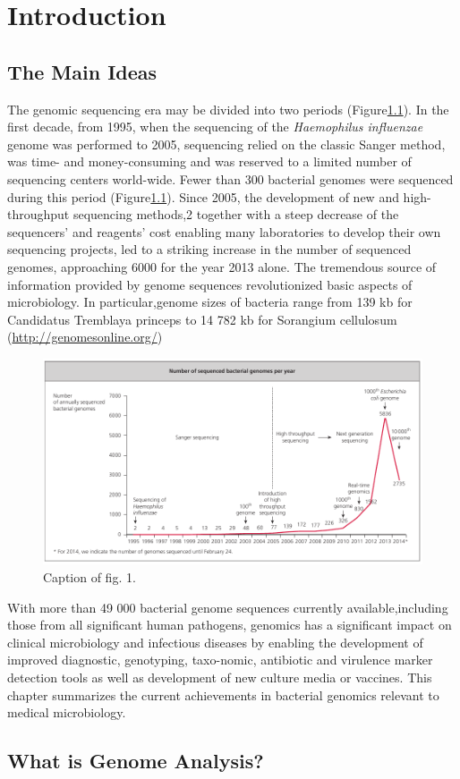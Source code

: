 \chapter{Introduction}\label{ch:ch1}
\section{The Main Ideas}
The genomic sequencing era may be divided into two periods (Figure\ref{fig:sequencing_stats}). In the first decade, from 1995, when the sequencing of the \textit{Haemophilus influenzae} genome was performed \cite{ray2003} to 2005, sequencing relied on the classic Sanger method, was time- and money-consuming and was reserved to a limited number of sequencing centers world-wide. Fewer than 300 bacterial genomes were sequenced during this period (Figure\ref{fig:sequencing_stats}). Since 2005, the development of new and high-throughput sequencing methods,2 together with a steep decrease of the sequencers’ and reagents’ cost enabling many laboratories to develop their own sequencing projects, led to a striking increase in the number of sequenced genomes, approaching 6000 for the year 2013 alone. The tremendous source of information provided by genome sequences revolutionized basic aspects of microbiology. In particular,genome sizes of bacteria range from 139 kb for Candidatus Tremblaya princeps to 14 782 kb for Sorangium cellulosum (\url{http://genomesonline.org/})  \cite{ray2003}

\begin{figure}
	\centering
	\includegraphics[width=0.9\linewidth]{images/sequencing_stats.png}
	\caption{Caption of fig. 1.}
	\label{fig:sequencing_stats}
\end{figure} 

With more than 49 000 bacterial genome sequences currently available,including those from all significant human pathogens, genomics has a significant impact on clinical microbiology and infectious diseases by enabling the development of improved diagnostic, genotyping, taxo-nomic, antibiotic and virulence marker detection tools as well as development of new culture media or vaccines. This chapter summarizes the current achievements in bacterial genomics relevant to medical microbiology.


\section{What is Genome Analysis?} 




